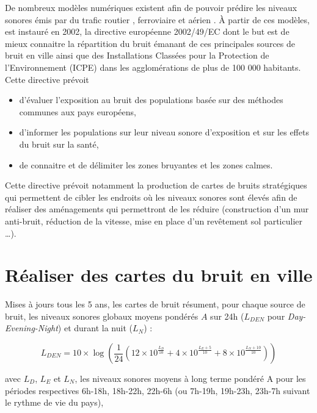 De nombreux modèles numériques existent afin de pouvoir prédire les niveaux sonores émis par du trafic routier \cite{quartieri2009review}, ferroviaire \cite{van2000railway} et aérien \cite{zaporozhets1998aircraft}.
À partir de ces modèles, est instauré en 2002, la directive européenne 2002/49/EC dont le but est de mieux connaitre la répartition du bruit émanant de ces principales sources de bruit en ville ainsi que des Installations Classées pour la Protection de l'Environnement (ICPE) dans les agglomérations de plus de 100 000 habitants. Cette directive prévoit

\begin{itemize}
	\item d'évaluer l'exposition au bruit des populations basée sur des méthodes communes aux pays européens,
	\item d'informer les populations sur leur niveau sonore d'exposition et sur les effets du bruit sur la santé,
	\item de connaitre et de délimiter les zones bruyantes et les zones calmes.\\
\end{itemize}

Cette directive prévoit notamment la production de cartes de bruits stratégiques qui permettent de cibler les endroits où les niveaux sonores sont élevés afin de réaliser des aménagements qui permettront de les réduire (construction d'un mur anti-bruit, réduction de la vitesse, mise en place d'un revêtement sol particulier \dots).


\section{Réaliser des cartes du bruit en ville}
Mises à jours tous les 5 ans, les cartes de bruit résument, pour chaque source de bruit, les niveaux sonores globaux moyens pondérés $A$ sur 24h ($L_{DEN}$ pour \textit{Day-Evening-Night}) et durant la nuit ($L_N$) : 

\begin{equation}
L_{DEN} = 10\times\log \left(\frac{1}{24} \left(12\times10^{\frac{L_D}{10}}+4\times10^{\frac{L_E+5}{10}}+8\times10^{\frac{L_N+10}{10}} \right)\right)
\end{equation} 

avec $L_D$, $L_E$ et $L_N$, les niveaux sonores moyens à long terme pondéré A pour les périodes respectives 6h-18h, 18h-22h, 22h-6h (ou 7h-19h, 19h-23h, 23h-7h suivant le rythme de vie du pays), 

